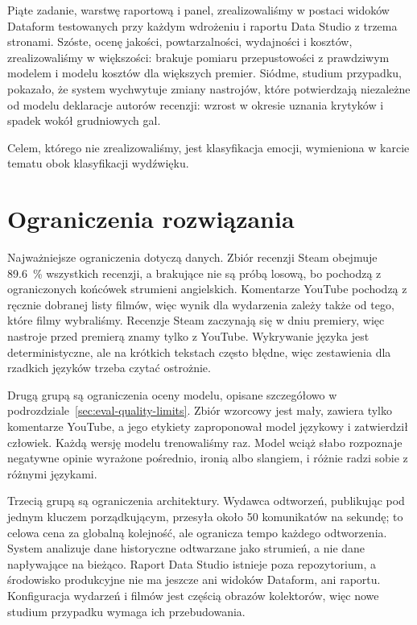 Piąte zadanie, warstwę raportową i panel, zrealizowaliśmy w postaci widoków Dataform testowanych przy każdym wdrożeniu i raportu Data Studio z trzema stronami.
Szóste, ocenę jakości, powtarzalności, wydajności i kosztów, zrealizowaliśmy w większości: brakuje pomiaru przepustowości z prawdziwym modelem i modelu kosztów dla większych premier.
Siódme, studium przypadku, pokazało, że system wychwytuje zmiany nastrojów, które potwierdzają niezależne od modelu deklaracje autorów recenzji: wzrost w okresie uznania krytyków i spadek wokół grudniowych gal.

Celem, którego nie zrealizowaliśmy, jest klasyfikacja emocji, wymieniona w karcie tematu obok klasyfikacji wydźwięku.

\section{Ograniczenia rozwiązania}
\label{sec:summary-limitations}

Najważniejsze ograniczenia dotyczą danych.
Zbiór recenzji Steam obejmuje \qty{89.6}{\percent} wszystkich recenzji, a brakujące nie są próbą losową, bo pochodzą z ograniczonych końcówek strumieni angielskich.
Komentarze YouTube pochodzą z ręcznie dobranej listy filmów, więc wynik dla wydarzenia zależy także od tego, które filmy wybraliśmy.
Recenzje Steam zaczynają się w dniu premiery, więc nastroje przed premierą znamy tylko z YouTube.
Wykrywanie języka jest deterministyczne, ale na krótkich tekstach często błędne, więc zestawienia dla rzadkich języków trzeba czytać ostrożnie.

Drugą grupą są ograniczenia oceny modelu, opisane szczegółowo w podrozdziale~\ref{sec:eval-quality-limits}.
Zbiór wzorcowy jest mały, zawiera tylko komentarze YouTube, a jego etykiety zaproponował model językowy i zatwierdził człowiek.
Każdą wersję modelu trenowaliśmy raz.
Model wciąż słabo rozpoznaje negatywne opinie wyrażone pośrednio, ironią albo slangiem, i różnie radzi sobie z różnymi językami.

Trzecią grupą są ograniczenia architektury.
Wydawca odtworzeń, publikując pod jednym kluczem porządkującym, przesyła około 50 komunikatów na sekundę; to celowa cena za globalną kolejność, ale ogranicza tempo każdego odtworzenia.
System analizuje dane historyczne odtwarzane jako strumień, a nie dane napływające na bieżąco.
Raport Data Studio istnieje poza repozytorium, a środowisko produkcyjne nie ma jeszcze ani widoków Dataform, ani raportu.
Konfiguracja wydarzeń i filmów jest częścią obrazów kolektorów, więc nowe studium przypadku wymaga ich przebudowania.

